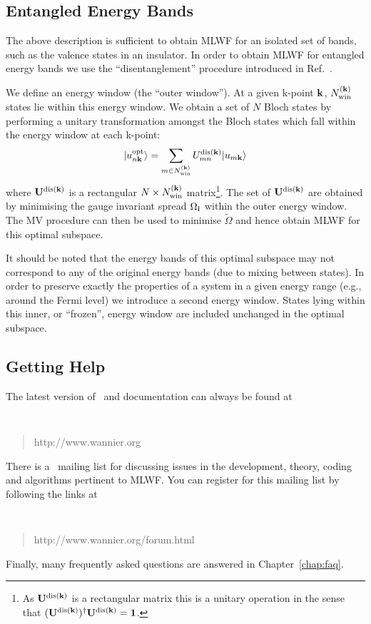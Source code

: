 \subsection{Entangled Energy Bands}\label{sec:disentangle}
The above description is sufficient to obtain MLWF for an
isolated set of bands, such as the valence states in an insulator. In
order to obtain MLWF for entangled energy bands we use the
``disentanglement'' procedure introduced in Ref.~\cite{SMV}.

We define an energy window (the ``outer window''). At a given
k-point $\bf{k}$, $N^{({\bf k})}_{{\rm win}}$ states lie within this
energy window. We obtain a set of $N$ Bloch states by
performing a unitary transformation amongst the Bloch states which
fall within the energy window at each k-point: 
 \begin{equation}
| u_{n{\bf k}}^{{\rm opt}}\rangle = \sum_{m\in N^{({\bf k})}_{{\rm win}}}
U^{{\rm dis}({\bf k})}_{mn} | u_{m{\bf k}}\rangle
\end{equation}
where $\bf{U}^{{\rm dis}({\bf k})}$ is a rectangular $N \times N^{({\bf k})}_{{\rm win}}$
 matrix\footnote{As $\bf{U}^{{\rm dis}({\bf k})}$ is a rectangular
 matrix this is a unitary operation in the sense that $(\bf{U}^{{\rm
 dis}({\bf k})})^{\dagger}\bf{U}^{{\rm dis}({\bf k})}=\bf{1}$.}. The
 set of $\bf{U}^{{\rm dis}({\bf k})}$ are obtained by minimising 
 the gauge invariant spread $\Omega_{{\rm I}}$ within the outer energy
 window. The MV procedure can then be used to minimise $\tilde{\Omega}$
 and hence obtain MLWF for this optimal subspace.

It should be noted that the energy bands of this optimal subspace may
not correspond to any of the original energy bands (due to mixing
between states). In order to preserve exactly the properties of a
system in a given energy range (e.g., around the Fermi level) we
introduce a second  energy window. States lying within this inner, or
``frozen'', energy window are included unchanged in the optimal
subspace.

\subsection{Getting Help}
The latest version of \wannier\ and documentation can always
be found at 
{\tt 
\begin{quote}
http://www.wannier.org
\end{quote} }
There is a \wannier\ mailing list for discussing issues in the
development, theory, coding and algorithms pertinent to MLWF.
You can register for this mailing list by following the links at
{\tt
\begin{quote}
http://www.wannier.org/forum.html
\end{quote} }
Finally, many frequently asked questions are answered in
Chapter~\ref{chap:faq}. 

